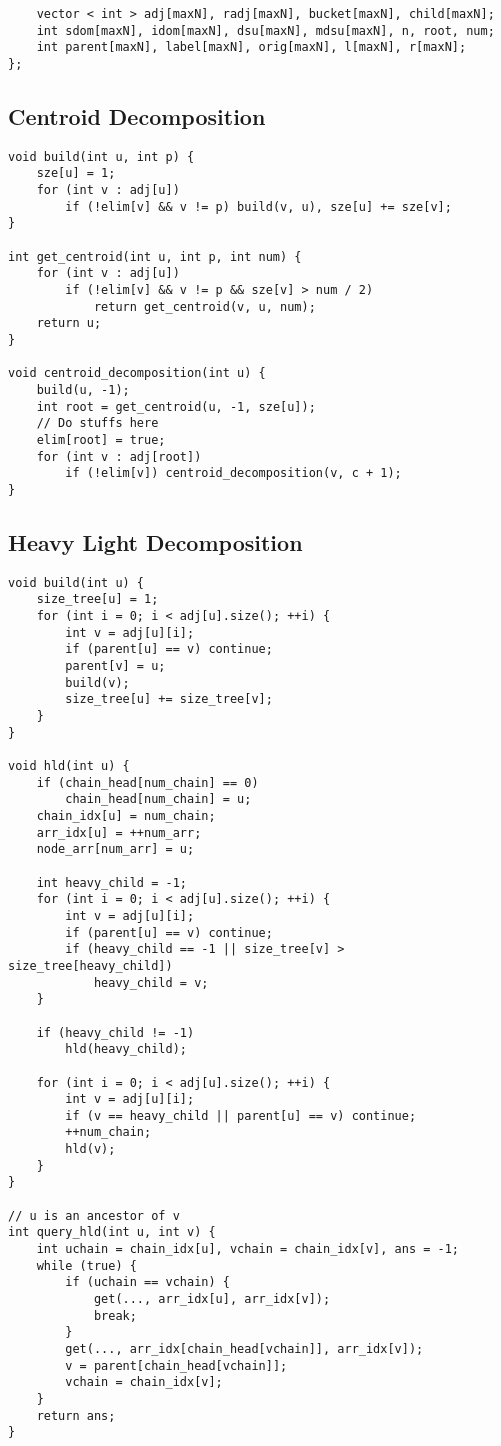 \documentclass[10pt,landscape]{article}
\begin{document}
\begin{multicols}{2}
\begin{lstlisting}
    vector < int > adj[maxN], radj[maxN], bucket[maxN], child[maxN];
    int sdom[maxN], idom[maxN], dsu[maxN], mdsu[maxN], n, root, num;
    int parent[maxN], label[maxN], orig[maxN], l[maxN], r[maxN];
};
\end{lstlisting}
\subsection{Centroid Decomposition}
\begin{lstlisting}
void build(int u, int p) {
    sze[u] = 1;
    for (int v : adj[u])
        if (!elim[v] && v != p) build(v, u), sze[u] += sze[v];
}

int get_centroid(int u, int p, int num) {
    for (int v : adj[u])
        if (!elim[v] && v != p && sze[v] > num / 2)
            return get_centroid(v, u, num);
    return u;
}

void centroid_decomposition(int u) {
    build(u, -1);
    int root = get_centroid(u, -1, sze[u]);
    // Do stuffs here
    elim[root] = true;
    for (int v : adj[root])
        if (!elim[v]) centroid_decomposition(v, c + 1);
}
\end{lstlisting}
\subsection{Heavy Light Decomposition}
\begin{lstlisting}
void build(int u) {
    size_tree[u] = 1;
    for (int i = 0; i < adj[u].size(); ++i) {
        int v = adj[u][i];
        if (parent[u] == v) continue;
        parent[v] = u;
        build(v);
        size_tree[u] += size_tree[v];
    }
}

void hld(int u) {
    if (chain_head[num_chain] == 0)
        chain_head[num_chain] = u;
    chain_idx[u] = num_chain;
    arr_idx[u] = ++num_arr;
    node_arr[num_arr] = u;
    
    int heavy_child = -1;
    for (int i = 0; i < adj[u].size(); ++i) {
        int v = adj[u][i];
        if (parent[u] == v) continue;
        if (heavy_child == -1 || size_tree[v] > size_tree[heavy_child])
            heavy_child = v;
    }

    if (heavy_child != -1)
        hld(heavy_child);

    for (int i = 0; i < adj[u].size(); ++i) {
        int v = adj[u][i];
        if (v == heavy_child || parent[u] == v) continue;
        ++num_chain;
        hld(v);
    }
}

// u is an ancestor of v
int query_hld(int u, int v) {
    int uchain = chain_idx[u], vchain = chain_idx[v], ans = -1;
    while (true) {
        if (uchain == vchain) {
            get(..., arr_idx[u], arr_idx[v]);
            break;
        }
        get(..., arr_idx[chain_head[vchain]], arr_idx[v]);
        v = parent[chain_head[vchain]];
        vchain = chain_idx[v];
    }
    return ans;
}
\end{lstlisting}

\end{multicols}
\end{document}
